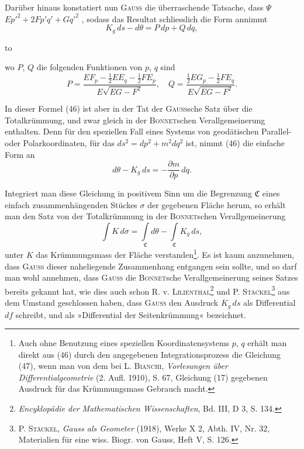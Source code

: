 \par\noindent\hspace*{\parindent}Darüber hinaus konstatiert nun \textsc{Gauss} die überraschende Tatsache, dass
 $\Psi$  $Ep'^2+2Fp'q'+Gq'^2$ , sodass das
Resultat schliesslich die Form annimmt
\begin{equation*}\tag{46}
K_g\,ds-d\theta=P\,dp+Q\,dq,
\end{equation*}
\par\noindent\hbox to\par
\clearpage{}
\noindent wo $P$, $Q$ die folgenden Funktionen von $p$, $q$ sind
\[
P=\frac{EF_p-\frac12EE_q-\frac12FE_p}{E\sqrt{EG-F^2}},\quad
Q=\frac{\frac12EG_p-\frac12FE_q}{E\sqrt{EG-F^2}}.
\]
\par\noindent\hspace*{\parindent}In dieser Formel (46) ist aber in der Tat der \textsc{Gauss}sche Satz über die
Totalkrümmung, und zwar gleich in der \textsc{Bonnet}schen Verallgemeinerung enthalten. Denn für den speziellen Fall eines Systems von geodätischen Parallel-
oder Polarkoordinaten, für das $ds^2=dp^2+m^2dq^2$ ist, nimmt (46) die einfache
Form an
\[
d\theta-K_g\,ds=-\frac{\partial m}{\partial p}\,dq.
\]
\par\noindent\hspace*{\parindent}Integriert man diese Gleichung in positivem Sinn um die Begrenzung $\mathfrak C$
eines einfach zusammenhängenden Stückes $\sigma$ der gegebenen Fläche herum, so
erhält man den Satz von der Totalkrümmung in der \textsc{Bonnet}schen Verallgemeinerung
\begin{equation*}\tag{47}
\int K\,d\sigma=\int\limits_{\mathfrak C}d\theta-\int\limits_{\mathfrak C}K_g\,ds,
\end{equation*}
unter $K$ das Krümmungsmass der Fläche verstanden\footnote{Auch ohne Benutzung eines speziellen Koordinatensystems $p$, $q$ erhält man direkt aus (46) durch
den angegebenen Integrationsprozess die Gleichung (47), wenn man von dem bei L. \textsc{Bianchi}, \textit{Vorlesungen über
Differentialgeometrie} (2. Aufl. 1910), S. 67, Gleichung (17) gegebenen Ausdruck für das Krümmungsmass Gebrauch macht.}. Es ist kaum anzunehmen, dass \textsc{Gauss} dieser naheliegende Zusammenhang entgangen sein sollte,
und so darf man wohl annehmen, dass \textsc{Gauss} die \textsc{Bonnet}sche Verallgemeinerung
seines Satzes bereits gekannt hat, wie dies auch schon R. v. \textsc{Lilienthal}\footnote{\textit{Encyklopädie der Mathematischen Wissenschaften}, Bd. III, D 3, S. 134.} und
P. \textsc{Stäckel}\footnote{P. \textsc{Stäckel}, \textit{Gauss als Geometer} (1918), Werke X 2, Abth. IV, Nr. 32, Materialien für eine wiss.
Biogr. von Gauss, Heft V, S. 126.} aus dem Umstand geschlossen haben, dass \textsc{Gauss} den Ausdruck
$K_g\,ds$ als Differential $df$ schreibt, und als »Differential der Seitenkrümmung«
bezeichnet.
\clearpage\endgroup
